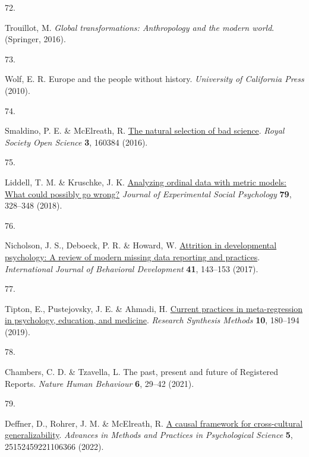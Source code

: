 \documentclass[
  man,floatsintext]{apa6}
\newlength{\cslhangindent}
\newlength{\csllabelwidth}
\newlength{\cslentryspacingunit} %
\newenvironment{CSLReferences}[2] %
 {%
  \setlength{\parindent}{0pt}
  \ifodd #1
  \let\oldpar\par
  \def\par{\hangindent=\cslhangindent\oldpar}
  \fi
  \setlength{\parskip}{#2\cslentryspacingunit}
 }%
 {}
\newcommand{\CSLLeftMargin}[1]{\parbox[t]{\csllabelwidth}{#1}}
\newcommand{\CSLRightInline}[1]{\parbox[t]{\linewidth - \csllabelwidth}{#1}\break}
\begin{document}
\begin{CSLReferences}{0}{0}
\leavevmode{}%
\CSLLeftMargin{72. }%
\CSLRightInline{Trouillot, M. \emph{Global transformations: Anthropology and the modern world}. (Springer, 2016).}

\leavevmode{}%
\CSLLeftMargin{73. }%
\CSLRightInline{Wolf, E. R. Europe and the people without history. \emph{University of California Press} (2010).}

\leavevmode{}%
\CSLLeftMargin{74. }%
\CSLRightInline{Smaldino, P. E. \& McElreath, R. \href{https://doi.org/10.1098/rsos.160384}{The natural selection of bad science}. \emph{Royal Society Open Science} \textbf{3}, 160384 (2016).}

\leavevmode{}%
\CSLLeftMargin{75. }%
\CSLRightInline{Liddell, T. M. \& Kruschke, J. K. \href{https://doi.org/10.1016/j.jesp.2018.08.009}{Analyzing ordinal data with metric models: What could possibly go wrong?} \emph{Journal of Experimental Social Psychology} \textbf{79}, 328--348 (2018).}

\leavevmode{}%
\CSLLeftMargin{76. }%
\CSLRightInline{Nicholson, J. S., Deboeck, P. R. \& Howard, W. \href{https://doi.org/10.1177/0165025415618275}{Attrition in developmental psychology: A review of modern missing data reporting and practices}. \emph{International Journal of Behavioral Development} \textbf{41}, 143--153 (2017).}

\leavevmode{}%
\CSLLeftMargin{77. }%
\CSLRightInline{Tipton, E., Pustejovsky, J. E. \& Ahmadi, H. \href{https://doi.org/10.1002/jrsm.1339}{Current practices in meta-regression in psychology, education, and medicine}. \emph{Research Synthesis Methods} \textbf{10}, 180--194 (2019).}

\leavevmode{}%
\CSLLeftMargin{78. }%
\CSLRightInline{Chambers, C. D. \& Tzavella, L. The past, present and future of {Registered Reports}. \emph{Nature Human Behaviour} \textbf{6}, 29--42 (2021).}

\leavevmode{}%
\CSLLeftMargin{79. }%
\CSLRightInline{Deffner, D., Rohrer, J. M. \& McElreath, R. \href{https://doi.org/10.1177/25152459221106366}{A causal framework for cross-cultural generalizability}. \emph{Advances in Methods and Practices in Psychological Science} \textbf{5}, 25152459221106366 (2022).}


\end{CSLReferences}
\end{document}
